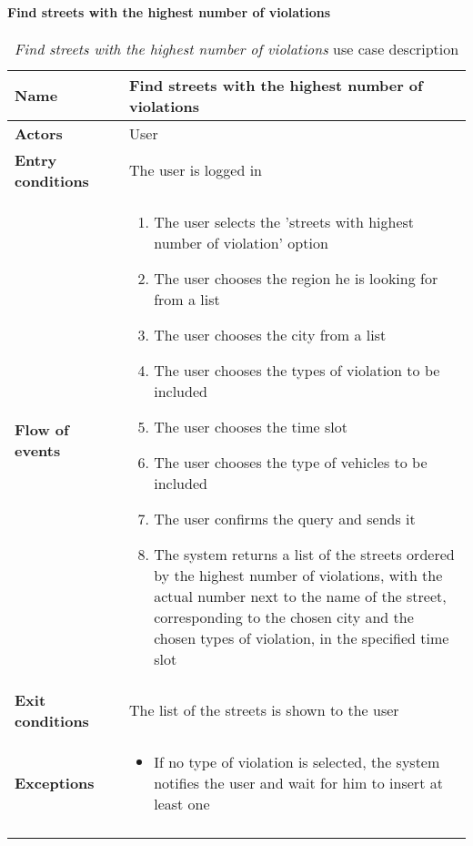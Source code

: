 		\paragraph{Find streets with the highest number of violations}
		\begin{longtable}{p{0.25\linewidth}p{0.75\linewidth}}
			\toprule
			\textbf{Name} & \textbf{Find streets with the highest number of violations} \\
			\midrule
			\textbf{Actors} & User \\
			\midrule
			\textbf{Entry conditions} & The user is logged in \\
			\midrule
			\textbf{Flow of events} & 
			\begin{enumerate}
				\item The user selects the 'streets with highest number of violation' option
				\item The user chooses the region he is looking for from a list
				\item The user chooses the city from a list
				\item The user chooses the types of violation to be included
				\item The user chooses the time slot
				\item The user chooses the type of vehicles to be included
				\item The user confirms the query and sends it
				\item The system returns a list of the streets ordered by the highest number of violations, with the actual number next to the name of the street, corresponding to the chosen city and the chosen types of violation, in the specified time slot
			\end{enumerate} \\
			\midrule
			\textbf{Exit conditions} & The list of the streets is shown to the user \\
			\midrule
			\textbf{Exceptions} & 
			\begin{itemize}
				\item 	If no type of violation is selected, the system notifies the user and wait for him to insert at least one	
			\end{itemize} \\
			\bottomrule
			\caption{\emph{Find streets with the highest number of violations} use case description}
		\end{longtable}
		
